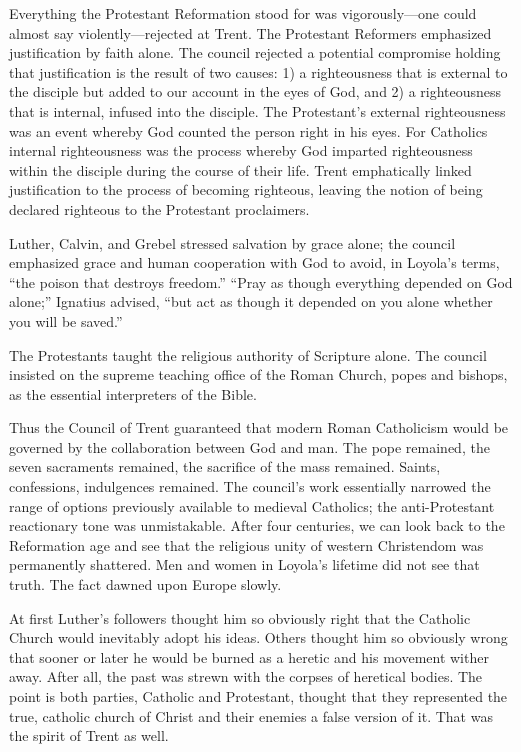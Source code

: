 Everything the Protestant Reformation stood for was vigorously—one could almost say
violently—rejected at Trent. The Protestant Reformers emphasized justification by faith alone. The
council rejected a potential compromise holding that justification is the result of two causes: 1) a
righteousness that is external to the disciple but added to our account in the eyes of God, and 2) a
righteousness that is internal, infused into the disciple. The Protestant’s external righteousness
was an event whereby God counted the person right in his eyes. For Catholics internal righteousness
was the process whereby God imparted righteousness within the disciple during the course of their
life. Trent emphatically linked justification to the process of becoming righteous, leaving the
notion of being declared righteous to the Protestant proclaimers.

Luther, Calvin, and Grebel stressed salvation by grace alone; the council emphasized grace and human
cooperation with God to avoid, in Loyola’s terms, “the poison that destroys freedom.” “Pray as
though everything depended on God alone;” Ignatius advised, “but act as though it depended on you
alone whether you will be saved.”

The Protestants taught the religious authority of Scripture alone. The council insisted on the
supreme teaching office of the Roman Church, popes and bishops, as the essential interpreters of the
Bible.

Thus the Council of Trent guaranteed that modern Roman Catholicism would be governed by the
collaboration between God and man. The pope remained, the seven sacraments remained, the sacrifice
of the mass remained. Saints, confessions, indulgences remained. The council’s work essentially
narrowed the range of options previously available to medieval Catholics; the anti-Protestant
reactionary tone was unmistakable. After four centuries, we can look back to the Reformation age and
see that the religious unity of western Christendom was permanently shattered. Men and women in
Loyola’s lifetime did not see that truth. The fact dawned upon Europe slowly.

At first Luther’s followers thought him so obviously right that the Catholic Church would inevitably
adopt his ideas. Others thought him so obviously wrong that sooner or later he would be burned as a
heretic and his movement wither away. After all, the past was strewn with the corpses of heretical
bodies. The point is both parties, Catholic and Protestant, thought that they represented the true,
catholic church of Christ and their enemies a false version of it. That was the spirit of Trent as
well.

